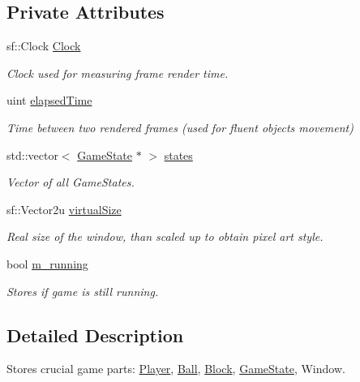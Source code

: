 \subsection*{Private Attributes}
\begin{DoxyCompactItemize}
\item 
sf\+::\+Clock \mbox{\hyperlink{class_game_engine_ac333df2252a88ef34ec94acd82db6264}{Clock}}
\begin{DoxyCompactList}\small\item\em Clock used for measuring frame render time. \end{DoxyCompactList}\item 
uint \mbox{\hyperlink{class_game_engine_a60668e07d7fc0c796bf773745f195cae}{elapsed\+Time}}
\begin{DoxyCompactList}\small\item\em Time between two rendered frames (used for fluent objects movement) \end{DoxyCompactList}\item 
std\+::vector$<$ \mbox{\hyperlink{class_game_state}{Game\+State}} $\ast$ $>$ \mbox{\hyperlink{class_game_engine_aacfdc453e12dcbf15cadb150839d72dd}{states}}
\begin{DoxyCompactList}\small\item\em Vector of all Game\+States. \end{DoxyCompactList}\item 
sf\+::\+Vector2u \mbox{\hyperlink{class_game_engine_a57b84b09b731bc5664a22f0e517de4dc}{virtual\+Size}}
\begin{DoxyCompactList}\small\item\em Real size of the window, than scaled up to obtain pixel art style. \end{DoxyCompactList}\item 
bool \mbox{\hyperlink{class_game_engine_ae587c23c6915881101bb2110dcb9370e}{m\+\_\+running}}
\begin{DoxyCompactList}\small\item\em Stores if game is still running. \end{DoxyCompactList}\end{DoxyCompactItemize}


\subsection{Detailed Description}
Stores crucial game parts\+: \mbox{\hyperlink{class_player}{Player}}, \mbox{\hyperlink{class_ball}{Ball}}, \mbox{\hyperlink{class_block}{Block}}, \mbox{\hyperlink{class_game_state}{Game\+State}}, Window. 

